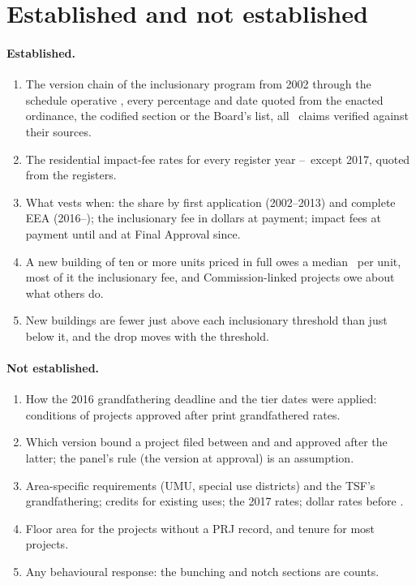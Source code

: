 \documentclass[11pt]{article}
\begin{document}
\section{Established and not established}\label{sec:exest}

\paragraph{Established.}
\begin{enumerate}
\item The version chain of the inclusionary program from 2002 through the schedule operative
, every percentage and date quoted from the enacted ordinance, the codified
section or the Board's list, all \exClaimsVerified\ claims verified against their sources.
\item The residential impact-fee rates for every register year \exRegFirst--\exRegLast\ except
2017, quoted from the registers.
\item What vests when: the share by first application (2002--2013) and complete EEA (2016--);
the inclusionary fee in dollars at payment; impact fees at payment until 
and at Final Approval since.
\item A new building of ten or more units priced in full owes a median \exPuMed\ per unit, most
of it the inclusionary fee, and Commission-linked projects owe about what others do.
\item New buildings are fewer just above each inclusionary threshold than just below it, and
the drop moves with the threshold.
\end{enumerate}

\paragraph{Not established.}
\begin{enumerate}
\item How the 2016 grandfathering deadline and the tier dates were applied: conditions of
projects approved after  print grandfathered rates.
\item Which version bound a project filed between  and
 and approved after the latter; the panel's rule (the version at
approval) is an assumption.
\item Area-specific requirements (UMU, special use districts) and the TSF's grandfathering;
credits for existing uses; the 2017 rates; dollar rates before \exRegFirst.
\item Floor area for the projects without a PRJ record, and tenure for most projects.
\item Any behavioural response: the bunching and notch sections are counts.
\end{enumerate}
\end{document}
